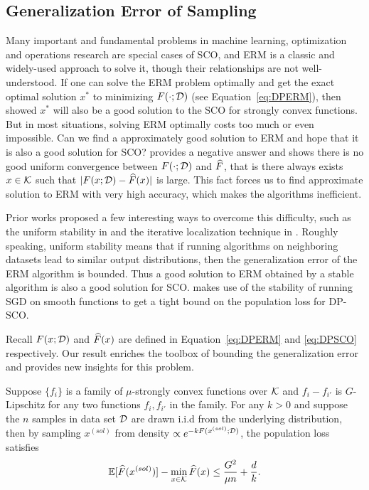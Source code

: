 

\subsection{Generalization Error of Sampling}
Many important and fundamental problems in machine learning, optimization and operations research are special cases of
SCO, and ERM is a classic and widely-used approach to solve it, though their relationships are not well-understood.
If one can solve the ERM problem optimally and get the exact optimal solution $x^*$ to minimizing $F(\cdot;\mathcal D)$ (see Equation~\ref{eq:DPERM}), then \cite{SSSSS09} showed $x^*$ will also be a good solution to the SCO for strongly convex functions.
But in most situations, solving ERM optimally costs too much or even impossible. 
Can we find a approximately good solution to ERM and hope that it is also a good solution for SCO?
\cite{Fel16} provides a negative answer and shows there is no good uniform convergence between $F(\cdot;\mathcal D)$ and $\widehat{F}$, that is there always exists $x\in\mathcal K$ such that $|F(x;\mathcal D)-\widehat{F}(x)|$ is large.
This fact forces us to find approximate solution to ERM with very high accuracy, which makes the algorithms inefficient.

Prior works proposed a few interesting ways to overcome this difficulty, such as the uniform stability in \cite{HRS16} and the iterative localization technique in \cite{AFKT21}.
Roughly speaking, uniform stability means that if running algorithms on neighboring datasets lead to similar output distributions, then the generalization error of the ERM algorithm is bounded.
Thus a good solution to ERM obtained by a stable algorithm is also a good solution for SCO.
\cite{bftt19} makes use of the stability of running SGD on smooth functions to get a tight bound on the population loss for DP-SCO.


Recall $F(x;\mathcal D)$ and $\widehat{F}(x)$ are defined in Equation~\eqref{eq:DPERM} and \eqref{eq:DPSCO} respectively. 
Our result enriches the toolbox of bounding the generalization error and provides new insights for this problem.
\begin{theorem}
Suppose $\{f_i\}$ is a family of $\mu$-strongly convex functions over $\mathcal K$ and $f_i-f_{i'}$ is $G$-Lipschitz for any two functions $f_i,f_{i'}$ in the family.
For any $k>0$ and suppose the $n$ samples in data set $\mathcal D$ are drawn i.i.d from the underlying distribution, then by sampling $x^{(sol)}$ from density $\propto e^{-kF(x^{(sol)};\mathcal D)}$, the population loss satisfies
\begin{align*}
    \operatorname*{\mathbb{E}}[\widehat{F}(x^{(sol)})]-\min_{x\in\mathcal K}\widehat{F}(x)\leq \frac{G^2}{\mu n}+ \frac{d}{k}.
\end{align*}
\end{theorem}

